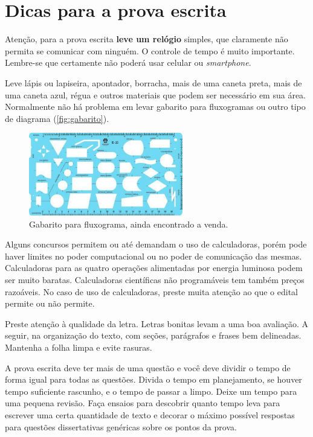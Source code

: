\documentclass{article}
\begin{document}
\section{Dicas para a prova escrita}

Atenção, para a prova escrita \textbf{leve um relógio} simples, que claramente não permita se comunicar com ninguém. O controle de tempo é muito importante. Lembre-se que certamente não poderá usar celular ou \textit{smartphone}. 

Leve lápis ou lapiseira, apontador, borracha, mais de uma caneta preta, mais de uma caneta azul, régua e outros materiais que podem ser necessário em sua área. Normalmente não há problema em levar gabarito para fluxogramas ou outro tipo de diagrama (\autoref{fig:gabarito}). 

\begin{figure}
    \centering
    \includegraphics[width=0.6\textwidth]{gabaritofluxograma.png}
    \caption{Gabarito para fluxograma, ainda encontrado a venda.}
    \label{fig:gabarito}
\end{figure}


Alguns concursos permitem ou até demandam o uso de calculadoras, porém pode haver limites no poder computacional ou no poder de comunicação das mesmas. Calculadoras para as quatro operações alimentadas por energia luminosa podem ser muito baratas. Calculadoras científicas não programáveis tem também preços razoáveis. No caso de uso de calculadoras, preste muita atenção ao que o edital permite ou não permite.

Preste atenção à qualidade da letra. Letras bonitas levam a uma boa avaliação. A seguir, na organização do texto, com seções, parágrafos e frases bem delineadas. Mantenha a folha limpa e evite rasuras.

A prova escrita deve ter mais de uma questão e você deve dividir o tempo de forma igual para todas as questões. 
Divida o tempo em planejamento, se houver tempo suficiente rascunho, e o tempo de passar a limpo. Deixe um tempo para uma pequena revisão. Faça ensaios para descobrir quanto tempo leva para escrever uma certa quantidade de texto e decorar o máximo possível respostas para questões dissertativas genéricas sobre os pontos da prova.
\end{document}
